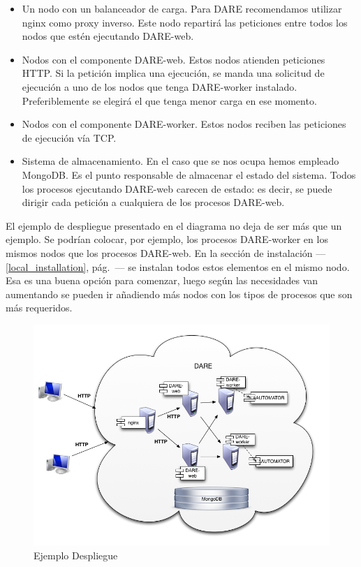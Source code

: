 \begin{itemize}
  \item Un nodo con un balanceador de carga. Para DARE recomendamos
    utilizar nginx\cite{NGINX} como proxy inverso. Este nodo repartirá
    las peticiones entre todos los nodos que estén ejecutando
    DARE-web.
  \item Nodos con el componente DARE-web. Estos nodos atienden
    peticiones HTTP. Si la petición implica una ejecución, se manda
    una solicitud de ejecución a uno de los nodos que tenga
    DARE-worker instalado. Preferiblemente se elegirá el que tenga
    menor carga en ese momento.
  \item Nodos con el componente DARE-worker. Estos nodos reciben las
    peticiones de ejecución vía TCP.
  \item Sistema de almacenamiento. En el caso que se nos ocupa hemos
    empleado MongoDB\cite{Mongo}. Es el punto responsable de almacenar
    el estado del sistema. Todos los procesos ejecutando DARE-web
    carecen de estado: es decir, se puede dirigir cada petición a
    cualquiera de los procesos DARE-web.
\end{itemize}

El ejemplo de despliegue presentado en el diagrama no deja de ser más
que un ejemplo. Se podrían colocar, por ejemplo, los procesos
DARE-worker en los mismos nodos que los procesos DARE-web. En la
sección de instalación ---\ref{local_installation},
pág.~\pageref{local_installation}--- se instalan todos estos elementos
en el mismo nodo. Esa es una buena opción para comenzar, luego según
las necesidades van aumentando se pueden ir añadiendo más nodos con
los tipos de procesos que son más requeridos.

\begin{landscape}
  \begin{figure}[hbp]
    \begin{center}
      \includegraphics[width=1.4\textwidth]{example-deployment.png}
    \end{center}
  \caption{Ejemplo Despliegue}\label{deployment_example}
  \end{figure}
\end{landscape}

